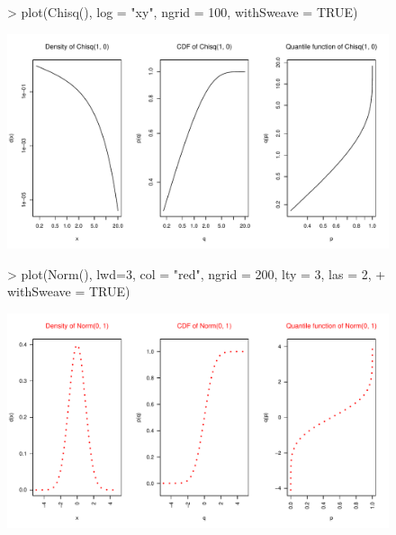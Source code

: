 \documentclass[11pt]{article}
\begin{document}
\begin{figure}[p]
\begin{Schunk}
\begin{Sinput}
> plot(Chisq(), log = "xy", ngrid = 100, withSweave = TRUE)
\end{Sinput}
\end{Schunk}
\includegraphics{distr-plotex7}
\end{figure}

\begin{figure}[p]
\begin{Schunk}
\begin{Sinput}
> plot(Norm(), lwd=3, col = "red", ngrid = 200, lty = 3, las = 2,
+      withSweave = TRUE)
\end{Sinput}
\end{Schunk}
\includegraphics{distr-plotex8}
\end{figure}
\end{document}

